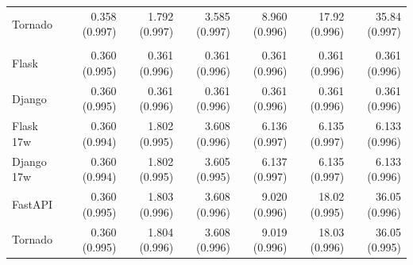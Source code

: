 \begin{table}[tbp]
\begin{tabular}{@{}lrrrrrr@{}}
    Tornado & 0.358 (0.997) & 1.792 (0.997) & 3.585 (0.997) & 8.960 (0.996) & 17.92 (0.996) & 35.84 (0.997) \\
    \addlinespace
    \multicolumn{7}{@{}l}{\emph{pipeline} ($S$ = 2.7615 s)} \\
    Flask & 0.360 (0.995) & 0.361 (0.996) & 0.361 (0.996) & 0.361 (0.996) & 0.361 (0.996) & 0.361 (0.996) \\
    Django & 0.360 (0.995) & 0.361 (0.996) & 0.361 (0.996) & 0.361 (0.996) & 0.361 (0.996) & 0.361 (0.996) \\
    Flask 17w & 0.360 (0.994) & 1.802 (0.995) & 3.608 (0.996) & 6.136 (0.997) & 6.135 (0.997) & 6.133 (0.996) \\
    Django 17w & 0.360 (0.994) & 1.802 (0.995) & 3.605 (0.995) & 6.137 (0.997) & 6.135 (0.997) & 6.133 (0.996) \\
    FastAPI & 0.360 (0.995) & 1.803 (0.996) & 3.608 (0.996) & 9.020 (0.996) & 18.02 (0.995) & 36.05 (0.996) \\
    Tornado & 0.360 (0.995) & 1.804 (0.996) & 3.608 (0.996) & 9.019 (0.996) & 18.03 (0.996) & 36.05 (0.995) \\
    \bottomrule
  \end{tabular}
\end{table}
